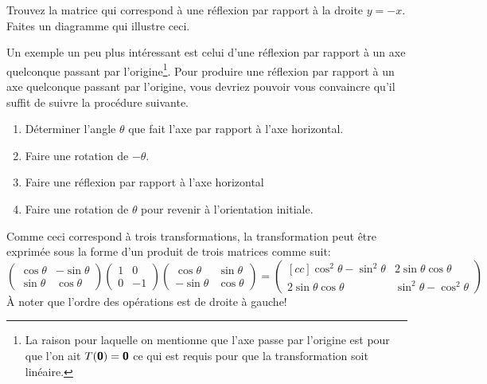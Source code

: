 \begin{exerciceB}
Trouvez la matrice qui correspond à une réflexion par rapport à la droite
$y=-x$.  Faites un diagramme qui illustre ceci.
\end{exerciceB}

Un exemple un peu plus intéressant est celui d'une réflexion par rapport à un
axe quelconque passant par l'origine\footnote{La raison pour laquelle
on mentionne que l'axe passe par l'origine est pour que l'on ait 
$T(\mbox{\textsf{\textbf{{0}}}}) = \mbox{\textsf{\textbf{{0}}}}$ ce qui est requis pour que la transformation soit linéaire.}.
Pour produire une réflexion par rapport à un axe quelconque passant par l'origine, vous
devriez pouvoir vous convaincre qu'il suffit de suivre la procédure suivante.
\begin{enumerate}
\item Déterminer l'angle $\theta$ que fait l'axe par rapport à l'axe horizontal.
\item Faire une rotation de $-\theta$.
\item Faire une réflexion par rapport à l'axe horizontal
\item Faire une rotation de $\theta$ pour revenir à l'orientation initiale.
\end{enumerate}
Comme ceci correspond à trois transformations, la transformation peut être exprimée sous
la forme d'un produit de trois matrices comme suit:
\[
\begin{pmatrix}
\cos\theta & -\sin\theta \\
\sin\theta & \cos\theta
\end{pmatrix}
\begin{pmatrix}
1 & 0 \\
0 & -1
\end{pmatrix}
\begin{pmatrix}
\cos\theta & \sin\theta \\
-\sin\theta & \cos\theta
\end{pmatrix}
=
\begin{pmatrix}[cc]
\cos^2\theta-\sin^2\theta & 2\sin\theta \cos\theta \\
2\sin\theta\cos\theta & \sin^2\theta-\cos^2\theta
\end{pmatrix}
\]
À noter que l'ordre des opérations est de droite à gauche!

